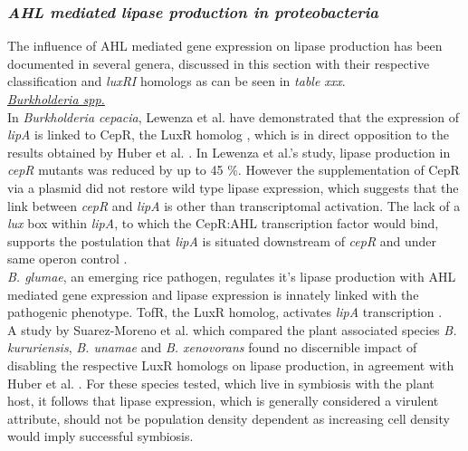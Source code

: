 \documentclass[11pt]{article}
\begin{document}
\subsubsection{\emph{AHL mediated lipase production in proteobacteria}}
The influence of AHL mediated gene expression on lipase production has been documented in several genera, discussed in this section with their respective classification and \emph{luxRI} homologs as can be seen in \emph{table xxx}.\\


\emph{\underline{Burkholderia spp.}} 
\\In \emph{Burkholderia cepacia}, Lewenza et al. have demonstrated that the expression of \emph{lipA} is linked to CepR, the LuxR homolog \cite{lewenza1999}, which is in direct opposition to the results obtained by Huber et al. \cite{huber2001}. In Lewenza et al.'s study, lipase production in \emph{cepR} mutants was reduced by up to 45 \%. However the supplementation of CepR via a plasmid did not restore wild type lipase expression, which suggests that the link between \emph{cepR} and \emph{lipA} is other than transcriptomal activation. The lack of a \emph{lux} box within \emph{lipA}, to which the CepR:AHL transcription factor would bind, supports the postulation that \emph{lipA} is situated downstream of \emph{cepR} and under same operon control \cite{lewenza1999}.\\



\emph{B. glumae}, an emerging rice pathogen, regulates it's lipase production with AHL mediated gene expression and lipase expression is innately linked with the pathogenic phenotype. TofR, the LuxR homolog, activates \emph{lipA} transcription \cite{devescovi_07}. \\


A study by Suarez-Moreno et al. which compared the plant associated species \emph{B. kururiensis}, \emph{B. unamae} and \emph{B. xenovorans} found no discernible impact of disabling the respective LuxR homologs on lipase production, in agreement with Huber et al. \cite{huber2001,suarez2010}. For these species tested, which live in symbiosis with the plant host, it follows that lipase expression, which is generally considered a virulent attribute, should not be population density dependent as increasing cell density would imply successful symbiosis. \\
\end{document}

